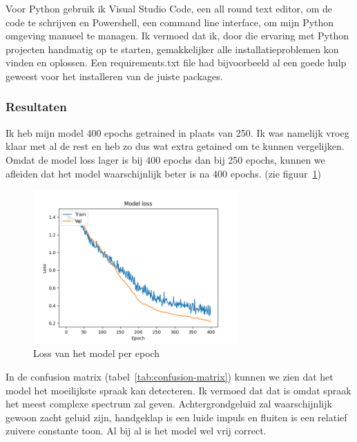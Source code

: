 Voor Python gebruik ik Visual Studio Code, een all round text editor, om de code te schrijven en Powershell, een command line interface, om mijn Python omgeving manueel te managen. Ik vermoed dat ik, door die ervaring met Python projecten handmatig op te starten, gemakkelijker alle installatieproblemen kon vinden en oplossen.
Een requirements.txt file \cite{pip-user-guide} had bijvoorbeeld al een goede hulp geweest voor het installeren van de juiste packages.

\subsubsection{Resultaten}
Ik heb mijn model 400 epochs getrained in plaats van 250. Ik was namelijk vroeg klaar met al de rest en heb zo dus wat extra getained om te kunnen vergelijken. Omdat de model loss lager is bij 400 epochs dan bij 250 epochs, kunnen we afleiden dat het model waarschijnlijk beter is na 400 epochs. (zie figuur~\ref{fig:cnn-training})

\begin{figure}[ht]
	\centering
	\includegraphics[width=0.7\textwidth]{figuren/cnn_model.png}
	\caption{Loss van het model per epoch}
	\label{fig:cnn-training}
\end{figure}

In de confusion matrix (tabel~\ref{tab:confusion-matrix}) kunnen we zien dat het model het moeilijkste spraak kan detecteren.
Ik vermoed dat dat is omdat spraak het meest complexe spectrum zal geven. Achtergrondgeluid zal waarschijnlijk gewoon zacht geluid zijn, handgeklap is een luide impuls en fluiten is een relatief zuivere constante toon.
Al bij al is het model wel vrij correct.

